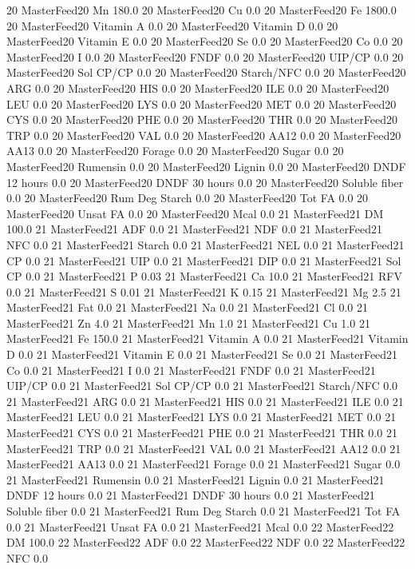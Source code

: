 \documentclass[letterpaper,10pt,english]{sphinxmanual}
\begin{document}
\begin{sphinxVerbatim}[commandchars=\\\{\},numbers=left,firstnumber=1,stepnumber=1]
20 MasterFeed20 Mn 180.0
20 MasterFeed20 Cu 0.0
20 MasterFeed20 Fe 1800.0
20 MasterFeed20 Vitamin A 0.0
20 MasterFeed20 Vitamin D 0.0
20 MasterFeed20 Vitamin E 0.0
20 MasterFeed20 Se 0.0
20 MasterFeed20 Co 0.0
20 MasterFeed20 I 0.0
20 MasterFeed20 FNDF 0.0
20 MasterFeed20 UIP/CP 0.0
20 MasterFeed20 Sol CP/CP 0.0
20 MasterFeed20 Starch/NFC 0.0
20 MasterFeed20 ARG 0.0
20 MasterFeed20 HIS 0.0
20 MasterFeed20 ILE 0.0
20 MasterFeed20 LEU 0.0
20 MasterFeed20 LYS 0.0
20 MasterFeed20 MET 0.0
20 MasterFeed20 CYS 0.0
20 MasterFeed20 PHE 0.0
20 MasterFeed20 THR 0.0
20 MasterFeed20 TRP 0.0
20 MasterFeed20 VAL 0.0
20 MasterFeed20 AA\PYGZsh{}12 0.0
20 MasterFeed20 AA\PYGZsh{}13 0.0
20 MasterFeed20 \PYGZpc{} Forage 0.0
20 MasterFeed20 Sugar \PYGZpc{} 0.0
20 MasterFeed20 Rumensin 0.0
20 MasterFeed20 Lignin 0.0
20 MasterFeed20 DNDF 12 hours 0.0
20 MasterFeed20 DNDF 30 hours 0.0
20 MasterFeed20 Soluble fiber 0.0
20 MasterFeed20 Rum Deg Starch 0.0
20 MasterFeed20 Tot FA 0.0
20 MasterFeed20 Unsat FA 0.0
20 MasterFeed20 Mcal 0.0
21 MasterFeed21 DM 100.0
21 MasterFeed21 ADF 0.0
21 MasterFeed21 NDF 0.0
21 MasterFeed21 NFC 0.0
21 MasterFeed21 Starch 0.0
21 MasterFeed21 NEL 0.0
21 MasterFeed21 CP 0.0
21 MasterFeed21 UIP 0.0
21 MasterFeed21 DIP 0.0
21 MasterFeed21 Sol CP 0.0
21 MasterFeed21 P 0.03
21 MasterFeed21 Ca 10.0
21 MasterFeed21 RFV 0.0
21 MasterFeed21 S 0.01
21 MasterFeed21 K 0.15
21 MasterFeed21 Mg 2.5
21 MasterFeed21 Fat 0.0
21 MasterFeed21 Na 0.0
21 MasterFeed21 Cl 0.0
21 MasterFeed21 Zn 4.0
21 MasterFeed21 Mn 1.0
21 MasterFeed21 Cu 1.0
21 MasterFeed21 Fe 150.0
21 MasterFeed21 Vitamin A 0.0
21 MasterFeed21 Vitamin D 0.0
21 MasterFeed21 Vitamin E 0.0
21 MasterFeed21 Se 0.0
21 MasterFeed21 Co 0.0
21 MasterFeed21 I 0.0
21 MasterFeed21 FNDF 0.0
21 MasterFeed21 UIP/CP 0.0
21 MasterFeed21 Sol CP/CP 0.0
21 MasterFeed21 Starch/NFC 0.0
21 MasterFeed21 ARG 0.0
21 MasterFeed21 HIS 0.0
21 MasterFeed21 ILE 0.0
21 MasterFeed21 LEU 0.0
21 MasterFeed21 LYS 0.0
21 MasterFeed21 MET 0.0
21 MasterFeed21 CYS 0.0
21 MasterFeed21 PHE 0.0
21 MasterFeed21 THR 0.0
21 MasterFeed21 TRP 0.0
21 MasterFeed21 VAL 0.0
21 MasterFeed21 AA\PYGZsh{}12 0.0
21 MasterFeed21 AA\PYGZsh{}13 0.0
21 MasterFeed21 \PYGZpc{} Forage 0.0
21 MasterFeed21 Sugar \PYGZpc{} 0.0
21 MasterFeed21 Rumensin 0.0
21 MasterFeed21 Lignin 0.0
21 MasterFeed21 DNDF 12 hours 0.0
21 MasterFeed21 DNDF 30 hours 0.0
21 MasterFeed21 Soluble fiber 0.0
21 MasterFeed21 Rum Deg Starch 0.0
21 MasterFeed21 Tot FA 0.0
21 MasterFeed21 Unsat FA 0.0
21 MasterFeed21 Mcal 0.0
22 MasterFeed22 DM 100.0
22 MasterFeed22 ADF 0.0
22 MasterFeed22 NDF 0.0
22 MasterFeed22 NFC 0.0

\end{sphinxVerbatim}
\end{document}
